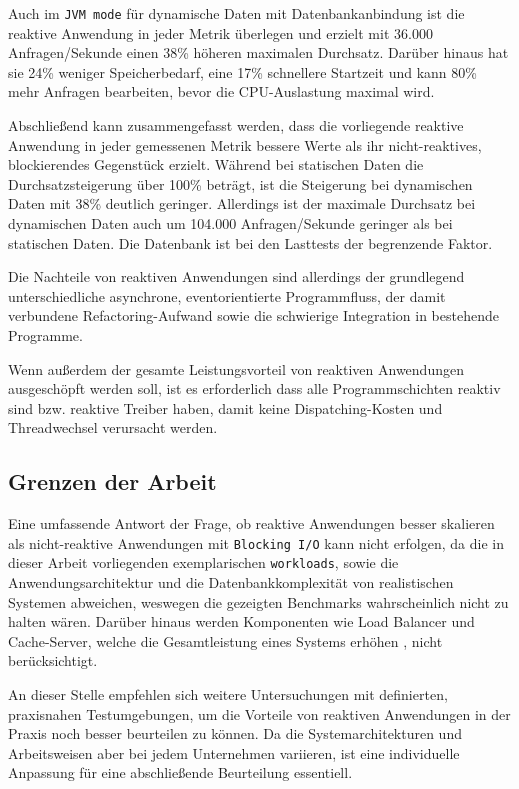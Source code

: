 Auch im \verb|JVM mode| für dynamische Daten mit Datenbankanbindung ist die reaktive Anwendung in jeder Metrik überlegen und erzielt
mit 36.000 Anfragen/Sekunde einen 38\% höheren maximalen Durchsatz. Darüber hinaus hat sie 24\% weniger Speicherbedarf, eine 17\% schnellere
Startzeit und kann 80\% mehr Anfragen bearbeiten, bevor die CPU-Auslastung maximal wird.

Abschließend kann zusammengefasst werden, dass die vorliegende reaktive Anwendung in jeder gemessenen Metrik bessere Werte als ihr
nicht-reaktives, blockierendes Gegenstück erzielt.
Während bei statischen Daten die Durchsatzsteigerung über 100\% beträgt, ist die
Steigerung bei dynamischen Daten mit 38\% deutlich geringer.
Allerdings ist der maximale Durchsatz bei dynamischen Daten auch
um 104.000 Anfragen/Sekunde geringer als bei statischen Daten. Die Datenbank ist bei den Lasttests der begrenzende Faktor.

Die Nachteile von reaktiven Anwendungen sind allerdings der grundlegend unterschiedliche asynchrone, eventorientierte Programmfluss,
der damit verbundene Refactoring-Aufwand sowie die schwierige Integration in bestehende Programme.

Wenn außerdem der gesamte Leistungsvorteil von reaktiven Anwendungen ausgeschöpft werden soll, ist es erforderlich
dass alle Programmschichten reaktiv sind bzw. reaktive Treiber haben, damit keine Dispatching-Kosten und Threadwechsel
verursacht werden.

\subsection{Grenzen der Arbeit}
\label{subsec:grenzen_der_arbeit}
Eine umfassende Antwort der Frage, ob reaktive Anwendungen besser skalieren als nicht-reaktive Anwendungen
mit \verb|Blocking I/O| kann nicht erfolgen, da die in dieser Arbeit vorliegenden exemplarischen \verb|workloads|, sowie
die Anwendungsarchitektur und die Datenbankkomplexität von realistischen Systemen abweichen, weswegen die gezeigten Benchmarks
wahrscheinlich nicht zu halten wären.
Darüber hinaus werden Komponenten wie Load Balancer und Cache-Server, welche die Gesamtleistung eines Systems erhöhen ,
nicht berücksichtigt.

An dieser Stelle empfehlen sich weitere Untersuchungen mit definierten, praxisnahen Testumgebungen, um die Vorteile
von reaktiven Anwendungen in der Praxis noch besser beurteilen zu können.
Da die Systemarchitekturen und Arbeitsweisen aber bei jedem Unternehmen variieren, ist eine individuelle Anpassung
für eine abschließende Beurteilung essentiell.

